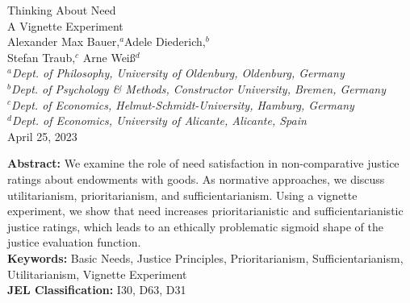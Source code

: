 \documentclass[12pt]{scrartcl}
\begin{document}
\thispagestyle{empty}
\renewcommand{\thefootnote}{\fnsymbol{footnote}}
\begin{center}
{\LARGE Thinking About Need}\\\vspace{2ex}
{\Large A Vignette Experiment}\\\vspace{6ex}
{\large Alexander Max Bauer,$^a$\footnotemark[1] Adele Diederich,$^b$\\Stefan Traub,$^{c}$ Arne Weiß$^d$}\\\vspace{3ex}
\textsl{\small $^{a}$Dept. of Philosophy, University of Oldenburg, Oldenburg, Germany}\\\vspace{1ex}
\textsl{\small $^{b}$Dept. of Psychology \& Methods, Constructor University, Bremen, Germany}\\\vspace{1ex}
\textsl{\small $^{c}$Dept. of Economics, Helmut-Schmidt-University, Hamburg, Germany}\\\vspace{1ex}
\textsl{\small $^{d}$Dept. of Economics, University of Alicante, Alicante, Spain}\\\vspace{3ex}
April 25, 2023
\end{center}

\vspace{\fill}

\noindent\textbf{Abstract:} We examine the role of need satisfaction in non-comparative justice ratings about endowments with goods. 
As normative approaches, we discuss utilitarianism, prioritarianism, and sufficientarianism.
Using a vignette experiment, we show that need increases prioritarianistic and sufficientarianistic justice ratings, which leads to an ethically problematic sigmoid shape of the justice evaluation function.
\\[2ex]
\noindent\textbf{Keywords:} Basic Needs, Justice Principles, Prioritarianism, Sufficientarianism, Utilitarianism, Vignette Experiment\\[2ex]
\textbf{JEL Classification:} I30, D63, D31

\renewcommand{\thefootnote}{\arabic{footnote}}\setcounter{footnote}{0}
\newpage
\end{document}
